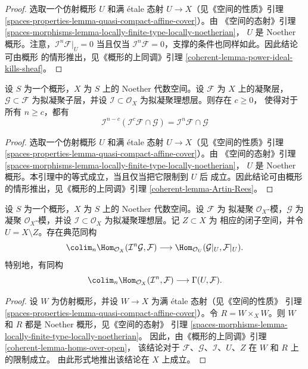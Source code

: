 \begin{proof}
选取一个仿射概形 $U$ 和满 \'etale 态射 $U \to X$（见《空间的性质》引理
\ref{spaces-properties-lemma-quasi-compact-affine-cover}）。由
《空间的态射》引理
\ref{spaces-morphisms-lemma-locally-finite-type-locally-noetherian}，
$U$ 是 Noether 概形。注意，$\mathcal{I}^n\mathcal{F}|_U = 0$ 当且仅当
$\mathcal{I}^n\mathcal{F} = 0$，支撑的条件也同样如此。因此结论可由概形
的情形推出，见《概形的上同调》引理
\ref{coherent-lemma-power-ideal-kills-sheaf}。
\end{proof}

\begin{lemma}
\label{lemma-Artin-Rees}
设 $S$ 为一个概形，$X$ 为 $S$ 上的 Noether 代数空间。设 $\mathcal{F}$ 为
$X$ 上的凝聚层，$\mathcal{G} \subset \mathcal{F}$ 为拟凝聚子层，并设
$\mathcal{I} \subset \mathcal{O}_X$ 为拟凝聚理想层。则存在 $c \geq 0$，
使得对于所有 $n \geq c$，都有
$$
\mathcal{I}^{n - c}(\mathcal{I}^c\mathcal{F} \cap \mathcal{G})
=
\mathcal{I}^n\mathcal{F} \cap \mathcal{G}
$$
\end{lemma}

\begin{proof}
选取一个仿射概形 $U$ 和满 \'etale 态射 $U \to X$（见《空间的性质》引理
\ref{spaces-properties-lemma-quasi-compact-affine-cover}）。由
《空间的态射》引理
\ref{spaces-morphisms-lemma-locally-finite-type-locally-noetherian}，
$U$ 是 Noether 概形。本引理中的等式成立，当且仅当把它限制到 $U$ 后
成立。因此结论可由概形的情形推出，见《概形的上同调》引理
\ref{coherent-lemma-Artin-Rees}。
\end{proof}

\begin{lemma}
\label{lemma-homs-over-open}
设 $S$ 为一个概形，$X$ 为 $S$ 上的 Noether 代数空间。设 $\mathcal{F}$ 为
拟凝聚 $\mathcal{O}_X$-模，$\mathcal{G}$ 为凝聚 $\mathcal{O}_X$-模，并设
$\mathcal{I} \subset \mathcal{O}_X$ 为拟凝聚理想层。记 $Z \subset X$ 为
相应的闭子空间，并令 $U = X \setminus Z$。存在典范同构
$$
\colim_n \Hom_{\mathcal{O}_X}(\mathcal{I}^n\mathcal{G}, \mathcal{F})
\longrightarrow
\Hom_{\mathcal{O}_U}(\mathcal{G}|_U, \mathcal{F}|_U).
$$
特别地，有同构
$$
\colim_n \Hom_{\mathcal{O}_X}(\mathcal{I}^n, \mathcal{F})
\longrightarrow
\Gamma(U, \mathcal{F}).
$$
\end{lemma}

\begin{proof}
设 $W$ 为仿射概形，并设 $W \to X$ 为满 \'etale 态射（见《空间的性质》
引理 \ref{spaces-properties-lemma-quasi-compact-affine-cover}）。令
$R = W \times_X W$。则 $W$ 和 $R$ 都是 Noether 概形，见《空间的态射》
引理 \ref{spaces-morphisms-lemma-locally-finite-type-locally-noetherian}。
因此，由《概形的上同调》引理 \ref{coherent-lemma-homs-over-open}，
该结论对于 $\mathcal{F}$、$\mathcal{G}$、$\mathcal{I}$、$U$、$Z$ 在
$W$ 和 $R$ 上的限制成立。%
由此形式地推出该结论在 $X$ 上成立。
\end{proof}






